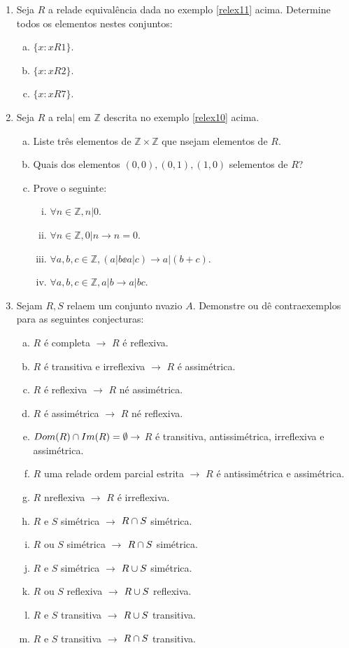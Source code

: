 \begin{enumerate}[{\bf 1.}]
\item Seja $R$ a rela\cao de equival\^encia dada no exemplo \ref{relex11} acima. Determine todos os elementos nestes conjuntos:
\begin{enumerate}[a)]
\item $\{x:xR1\}$.
\item $\{x:xR2\}$.
\item $\{x:xR7\}$.
\end{enumerate}

\item Seja $R$ a rela\cao $|$ em $\mathbb{Z}$ descrita no exemplo \ref{relex10} acima.
\begin{enumerate}[a)]
\item Liste tr\^es elementos de $\mathbb{Z}\times\mathbb{Z}$ que n\ao sejam elementos de $R$.
\item Quais dos elementos $(0,0),(0,1),(1,0)$ s\ao elementos de $R$?
\item Prove o seguinte:
\begin{enumerate}[i)]
\item $\forall n\in \mathbb{Z}, n|0$.
\item $\forall n\in \mathbb{Z}, 0|n\to n=0$.
\item $\forall a,b,c\in \mathbb{Z}, (a|b\ee a|c)\to a|(b+c)$.
\item $\forall a,b,c\in \mathbb{Z}, a|b\to a|bc$.
\end{enumerate}
\end{enumerate}

\item Sejam $R,S$ rela\coes em um conjunto n\ao vazio $A$. Demonstre ou d\^e contraexemplos para as seguintes conjecturas:
\begin{enumerate}[a)]
\item $R$ \'e completa $\to$ $R$ \'e reflexiva.
\item $R$ \'e transitiva e irreflexiva $\to$ $R$ \'e assim\'etrica.
\item $R$ \'e reflexiva $\to$ $R$ n\ao \'e assim\'etrica. 
\item $R$ \'e assim\'etrica $\to$ $R$ n\ao \'e reflexiva.
\item $Dom(R)\cap Im(R)=\emptyset\to$ $R$ \'e transitiva, antissim\'etrica, irreflexiva e assim\'etrica.
\item $R$ uma rela\cao de ordem parcial estrita $\to$ $R$ \'e antissim\'etrica e assim\'etrica. 
\item $R$ n\ao reflexiva $\to$ $R$ \'e irreflexiva.
\item $R$ e $S$ sim\'etrica $\to$ $R\cap S$ sim\'etrica. 
\item $R$ ou $S$ sim\'etrica $\to$ $R\cap S$ sim\'etrica.
\item $R$ e $S$ sim\'etrica $\to$ $R\cup S$ sim\'etrica.
\item $R$ ou $S$ reflexiva $\to$ $R\cup S$ reflexiva.
\item $R$ e $S$ transitiva $\to$ $R\cup S$ transitiva.
\item $R$ e $S$ transitiva $\to$ $R\cap S$ transitiva.
\end{enumerate}


\end{enumerate}
